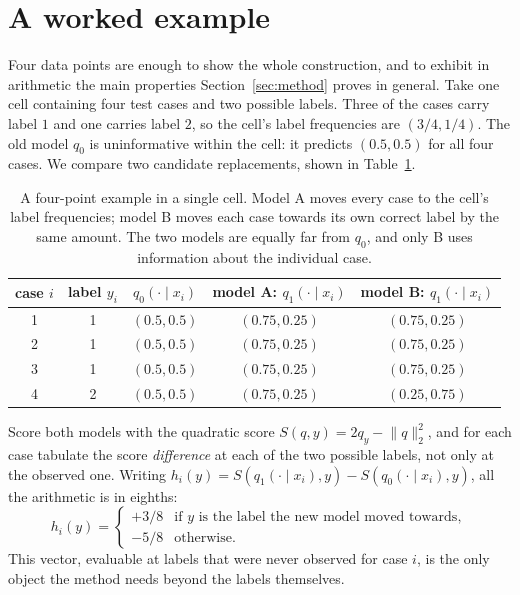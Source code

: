 \section{A worked example}\label{sec:worked}

Four data points are enough to show the whole construction, and to exhibit in arithmetic
the main properties Section~\ref{sec:method} proves in general. Take one cell containing
four test cases and two possible labels. Three of the cases carry label $1$ and one
carries label $2$, so the cell's label frequencies are $(3/4,1/4)$. The old model $q_0$
is uninformative within the cell: it predicts $(0.5,0.5)$ for all four cases. We compare
two candidate replacements, shown in Table~\ref{tab:worked}.

\begin{table}[t]
\centering
\small
\caption{A four-point example in a single cell. Model A moves every case to the cell's
label frequencies; model B moves each case towards its own correct label by the same
amount. The two models are equally far from $q_0$, and only B uses information about the
individual case.}
\label{tab:worked}
\begin{tabular}{@{}ccccc@{}}
\toprule
case $i$ & label $y_i$ & $q_0(\cdot\mid x_i)$ & model A: $q_1(\cdot\mid x_i)$ &
model B: $q_1(\cdot\mid x_i)$ \\
\midrule
1 & 1 & $(0.5,0.5)$ & $(0.75,0.25)$ & $(0.75,0.25)$ \\
2 & 1 & $(0.5,0.5)$ & $(0.75,0.25)$ & $(0.75,0.25)$ \\
3 & 1 & $(0.5,0.5)$ & $(0.75,0.25)$ & $(0.75,0.25)$ \\
4 & 2 & $(0.5,0.5)$ & $(0.75,0.25)$ & $(0.25,0.75)$ \\
\bottomrule
\end{tabular}
\end{table}

Score both models with the quadratic score $S(q,y)=2q_y-\lVert q\rVert_2^2$, and for each
case tabulate the score \emph{difference} at each of the two possible labels, not only at
the observed one. Writing $h_i(y)=S(q_1(\cdot\mid x_i),y)-S(q_0(\cdot\mid x_i),y)$, all
the arithmetic is in eighths:
\begin{equation}
h_i(y)=
\begin{cases}
+3/8 & \text{if $y$ is the label the new model moved towards},\\
-5/8 & \text{otherwise}.
\end{cases}
\label{eq:worked-h}
\end{equation}
This vector, evaluable at labels that were never observed for case $i$, is the only object
the method needs beyond the labels themselves.

